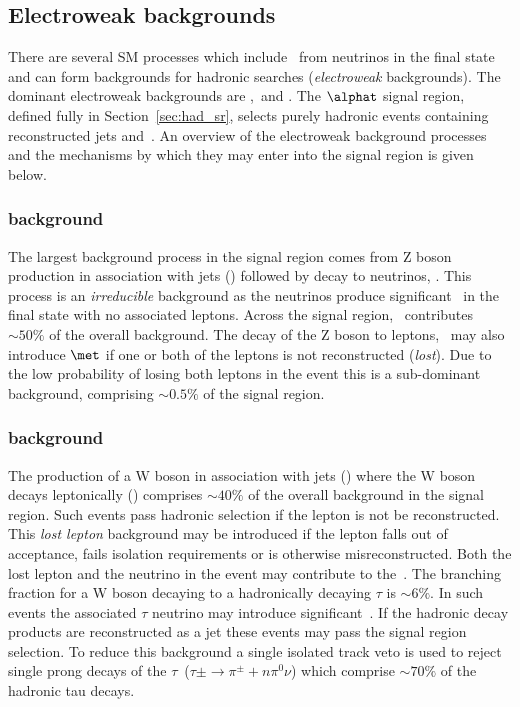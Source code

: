 \subsection{Electroweak backgrounds}
\label{sec:ewk-background-intro}
There are several SM processes which include \met~from neutrinos in the final state
and can form backgrounds for hadronic searches (\emph{electroweak} backgrounds). The dominant electroweak
backgrounds are \wj,\ttj~and \zj. The $\alphat$ signal region, defined fully in 
Section~\ref{sec:had_sr}, selects purely hadronic events
containing reconstructed jets and~\met. An overview of the electroweak background processes 
and the mechanisms by which they may enter into the signal region is given below. 

\subsubsection{\zj background}

The largest background process in the signal region comes from Z boson production
in association with jets (\zj) followed by decay to neutrinos, \znunu. This process is 
an \emph{irreducible} background as the neutrinos produce significant \met~in the final 
state with no associated leptons. Across the signal region, \znunu~contributes $\sim 50\%$ of 
the overall background. The decay of the Z boson to leptons, \zll~may also introduce $\met$ if 
one or both of the leptons is not reconstructed (\emph{lost}). Due to the low probability of
losing both leptons in the event this is a sub-dominant background, comprising $\sim 0.5\%$ of the signal region.

\subsubsection{\wj background}

The production of a W boson in association with jets (\wj) where the W boson decays leptonically
(\wl) comprises $\sim 40\%$ of the overall background in the signal region. 
Such events pass hadronic selection if the lepton is not be reconstructed.
This \emph{lost lepton} background may be introduced if the lepton falls out of acceptance,
fails isolation requirements or is otherwise misreconstructed. Both the lost lepton 
and the neutrino in the event may contribute to the~\met. 
The branching fraction for a W boson decaying to a hadronically decaying $\tau$ is $\sim6\%$.
In such events the associated $\tau$ neutrino may introduce significant~\met. If the hadronic
decay products are reconstructed as a jet these events may pass the signal region selection.
To reduce this background a single isolated track veto is used to reject single prong decays of the 
$\tau$~($\tau{\pm}\rightarrow\pi^{\pm}+n\pi^{0}\nu$) which comprise $\sim70\%$ of the hadronic tau decays.

